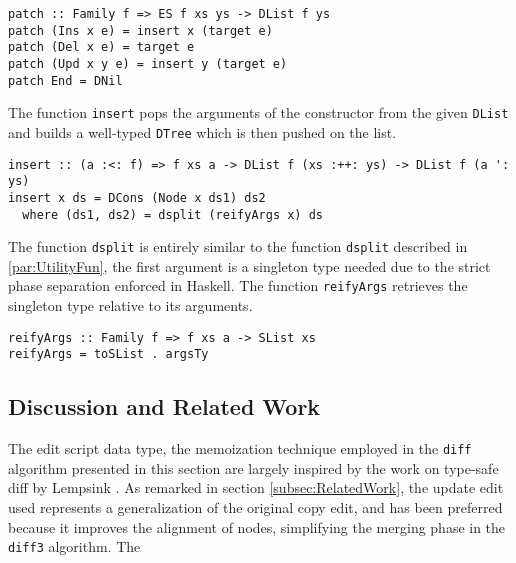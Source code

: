 \documentclass[../Thesis.tex]{subfiles}
\begin{document}
\begin{verbatim}
patch :: Family f => ES f xs ys -> DList f ys
patch (Ins x e) = insert x (target e)
patch (Del x e) = target e
patch (Upd x y e) = insert y (target e)
patch End = DNil
\end{verbatim}

	The function \texttt{insert} pops the arguments of the 
	constructor from the given \texttt{DList} and builds
	a well-typed \texttt{DTree} which is then pushed on the list.

\begin{verbatim}
insert :: (a :<: f) => f xs a -> DList f (xs :++: ys) -> DList f (a ': ys)
insert x ds = DCons (Node x ds1) ds2
  where (ds1, ds2) = dsplit (reifyArgs x) ds
\end{verbatim}

	The function \texttt{dsplit} is entirely similar to the function
	\texttt{dsplit} described in \ref{par:UtilityFun}, the first 
	argument is a singleton type needed due to the strict
	phase separation enforced in Haskell.
	The function \texttt{reifyArgs} retrieves the singleton
	type relative to its arguments.

\begin{verbatim}
reifyArgs :: Family f => f xs a -> SList xs
reifyArgs = toSList . argsTy
\end{verbatim}

	\subsection{Discussion and Related Work}
	The edit script data type, the memoization technique 
	employed in the \texttt{diff} algorithm presented in this section
	are largely inspired by the work on type-safe diff by 
	Lempsink \cite{Lemp09}.
	As remarked in section \ref{subsec:RelatedWork}, the update
	edit used represents a generalization of the original copy edit, 
	and has been preferred because it improves the alignment of nodes, 
	simplifying the merging phase in the \texttt{diff3} algorithm.
	The 
\end{document}
